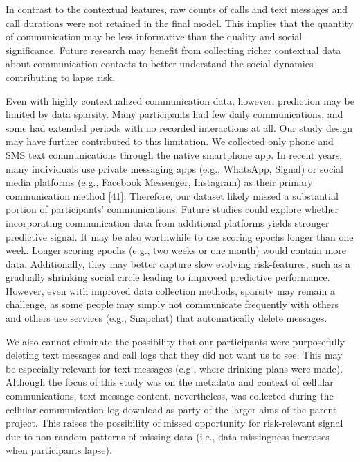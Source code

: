 \documentclass[
  letterpaper,
  DIV=11,
  numbers=noendperiod]{scrartcl}
\begin{document}
In contrast to the contextual features, raw counts of calls and text
messages and call durations were not retained in the final model. This
implies that the quantity of communication may be less informative than
the quality and social significance. Future research may benefit from
collecting richer contextual data about communication contacts to better
understand the social dynamics contributing to lapse risk.

Even with highly contextualized communication data, however, prediction
may be limited by data sparsity. Many participants had few daily
communications, and some had extended periods with no recorded
interactions at all. Our study design may have further contributed to
this limitation. We collected only phone and SMS text communications
through the native smartphone app. In recent years, many individuals use
private messaging apps (e.g., WhatsApp, Signal) or social media
platforms (e.g., Facebook Messenger, Instagram) as their primary
communication method {[}41{]}. Therefore, our dataset likely missed a
substantial portion of participants' communications. Future studies
could explore whether incorporating communication data from additional
platforms yields stronger predictive signal. It may be also worthwhile
to use scoring epochs longer than one week. Longer scoring epochs (e.g.,
two weeks or one month) would contain more data. Additionally, they may
better capture slow evolving risk-features, such as a gradually
shrinking social circle leading to improved predictive performance.
However, even with improved data collection methods, sparsity may remain
a challenge, as some people may simply not communicate frequently with
others and others use services (e.g., Snapchat) that automatically
delete messages.

We also cannot eliminate the possibility that our participants were
purposefully deleting text messages and call logs that they did not want
us to see. This may be especially relevant for text messages (e.g.,
where drinking plans were made). Although the focus of this study was on
the metadata and context of cellular communications, text message
content, nevertheless, was collected during the cellular communication
log download as party of the larger aims of the parent project. This
raises the possibility of missed opportunity for risk-relevant signal
due to non-random patterns of missing data (i.e., data missingness
increases when participants lapse).
\end{document}
